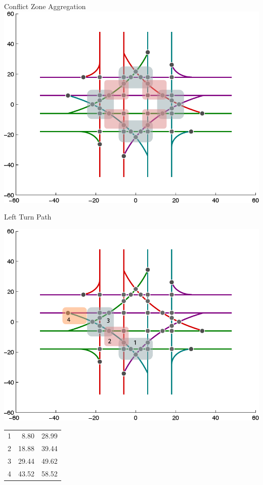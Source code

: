 \begin{frame}{Conflict Zone Aggregation}
\centering\includegraphics[width=0.8\linewidth]{diagram/intxn_zones.pdf}
\end{frame}


\begin{frame}{Left Turn Path}
\begin{minipage}{0.65\linewidth}
\centering\includegraphics[width=\linewidth]{diagram/intxn_partition_left.pdf}
\end{minipage}
\hfill
\begin{minipage}{0.3\linewidth}
\footnotesize
	\begin{tabular}{| c | r r |}
	\hline
	1 & 8.80 & 28.99 \\
	2 & 18.88 & 39.44 \\
	3 & 29.44 & 49.62 \\
	4 & 43.52 & 58.52 \\
	\hline
	\end{tabular}
\end{minipage}
\end{frame}

